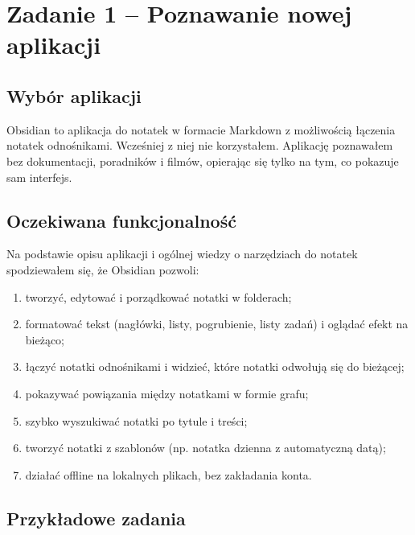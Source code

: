 \documentclass[11pt,a4paper]{article}
\begin{document}
\section{Zadanie 1 -- Poznawanie nowej aplikacji}

\subsection{Wybór aplikacji}

Obsidian to aplikacja do notatek w formacie Markdown z możliwością łączenia notatek odnośnikami. Wcześniej z niej nie korzystałem. Aplikację poznawałem bez dokumentacji, poradników i filmów, opierając się tylko na tym, co pokazuje sam interfejs.

\subsection{Oczekiwana funkcjonalność}

Na podstawie opisu aplikacji i ogólnej wiedzy o narzędziach do notatek spodziewałem się, że Obsidian pozwoli:

\begin{enumerate}[leftmargin=*]
  \item tworzyć, edytować i porządkować notatki w folderach;
  \item formatować tekst (nagłówki, listy, pogrubienie, listy zadań) i oglądać efekt na bieżąco;
  \item łączyć notatki odnośnikami i widzieć, które notatki odwołują się do bieżącej;
  \item pokazywać powiązania między notatkami w formie grafu;
  \item szybko wyszukiwać notatki po tytule i treści;
  \item tworzyć notatki z szablonów (np. notatka dzienna z automatyczną datą);
  \item działać offline na lokalnych plikach, bez zakładania konta.
\end{enumerate}

\subsection{Przykładowe zadania}
\end{document}
